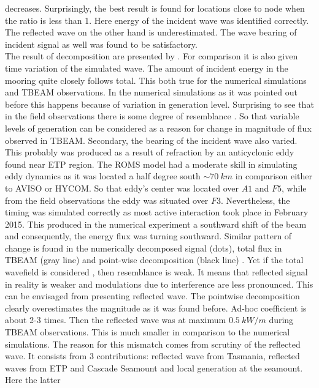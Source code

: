 \documentclass[12pt]{article}
\begin{document}
decreases. Surprisingly, the best result is found for locations close to node when the ratio is 
less than 1. Here energy of the incident wave was identified correctly. The reflected wave on the 
other hand is underestimated. The wave bearing of incident signal as well was found to be 
satisfactory.\\
The result of decomposition are presented by . For comparison it is also 
given time variation of the simulated wave. The amount of incident energy in the mooring quite 
closely follows total. This both true for the numerical simulations and TBEAM observations. In the 
numerical simulations as it was pointed out before this happens because of variation in generation 
level. Surprising to see that in the field observations there is some degree of resemblance 
. So 
that variable levels of generation can be considered as a reason for change in magnitude of flux 
observed in TBEAM. Secondary, the bearing of the incident wave also varied. This probably was 
produced as a result of refraction by an anticyclonic eddy found near ETP region. The ROMS 
model had a moderate skill in simulating eddy dynamics as it was located a half degree 
south $\sim 70~km$ in comparison either to AVISO or HYCOM. So that eddy's center was located over 
$A1$ and $F5$, while from the field observations the eddy was situated over $F3$. Nevertheless, the 
timing was simulated correctly as most active interaction took place in February 2015. This 
produced in the numerical experiment a southward shift of the beam and consequently, the energy 
flux was turning southward. Similar pattern of change is found in the numerically decomposed signal 
(dots), total flux in TBEAM (gray line) and point-wise decomposition (black line) 
. Yet if the total wavefield is considered 
, then resemblance is weak. It means that reflected signal in 
reality is weaker and modulations due to interference are less pronounced. This can be envisaged 
from  presenting reflected wave. The pointwise decomposition 
clearly overestimates the magnitude as it was found before. Ad-hoc coefficient is about 2-3 
times. Then the reflected wave was at maximum $0.5~kW/m$ during TBEAM observations. This is 
much smaller in comparison to the numerical simulations. The reason for this mismatch comes from 
scrutiny of the reflected wave. It consists from 3 contributions: reflected wave from Tasmania, 
reflected waves from ETP and Cascade Seamount and local generation at the seamount. Here the latter 
\end{document}
